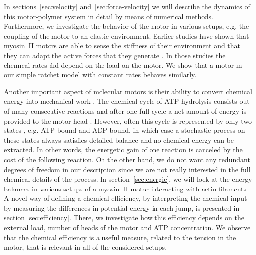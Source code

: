 \documentclass[aps,pre,twocolumn,showpacs,showkeys,superscriptaddress,floatfix]{revtex4-1}
\begin{document}
In sections~\ref{sec:velocity} and~\ref{sec:force-velocity} we will describe the dynamics of this motor-polymer system in detail by means of numerical methods.
Furthermore, we investigate the behavior of the motor in various setups, e.g. the coupling of the motor to an elastic environment.
Earlier studies have shown that myosin~II motors are able to sense the stiffness of their environment and that they can adapt the active forces that they generate \cite{stam2015isoforms,Albert2014}.
In those studies the chemical rates did depend on the load on the motor. 
We show that a motor in our simple ratchet model with constant rates behaves similarly.

Another important aspect of molecular motors is their ability to convert chemical energy into mechanical work \cite{astumian1996mechanochemical}.
The chemical cycle of ATP hydrolysis consists out of many consecutive reactions and after one full cycle a net amount of energy is provided to the motor head \cite{gajewski1986thermodynamics}.
However, often this cycle is represented by only two states \cite{julicher1997modeling,Reimann2002introduction}, e.g. ATP bound and ADP bound, 
in which case a stochastic process on these states always satisfies detailed balance and no chemical energy can be extracted. 
In other words, the energetic gain of one reaction is canceled by the cost of the following reaction.
On the other hand, we do not want any redundant degrees of freedom in our description since we are not really interested in the full chemical details of the process.
In section~\ref{sec:energie}, we will look at the energy balances in various setups of a myosin~II motor interacting with actin filaments.
A novel way of defining a chemical efficiency, by interpreting the chemical input by measuring the differences in potential energy in each jump, is presented in section \ref{sec:efficiency}. 
There, we investigate how this efficiency depends on the external load, number of heads of the motor and ATP concentration. 
We observe that the chemical efficiency is a useful measure, related to the tension in the motor, that is relevant in all of the considered setups.
\end{document}

